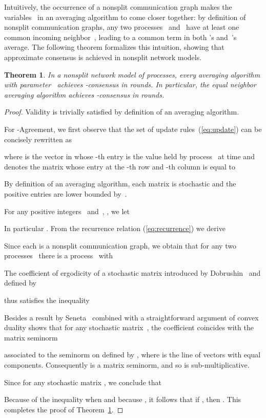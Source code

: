 \documentclass[a4paper]{article}
\theoremstyle{newthm}
\newtheorem{thm}{Theorem}
\begin{document}
Intuitively, the occurrence of a nonsplit communication graph makes
	 the variables~   in an averaging algorithm to come closer  
	 together: by definition of nonsplit communication graphs, any two 
	 processes~ and~ have at least one common incoming neighbor~, 
	 leading to a common term in both 's and~'s average.
The following theorem  formalizes this intuition, showing
     that approximate consensus is achieved in nonsplit network models.  

\begin{thm}\label{thm:nonsplit}
In a nonsplit network model of  processes, every averaging algorithm with parameter~
	achieves -consensus in 
	 rounds.
In particular, the equal neighbor averaging algorithm achieves -consensus in 
	 rounds. 
\end{thm}

\begin{proof}
Validity is trivially satisfied by definition of an averaging algorithm.

For -Agreement, we first observe that the set of update rules~(\ref{eq:update}) can be concisely rewritten as 
	
	where  is the vector in  whose -th entry is the value held by process~
	at time  and  denotes the  matrix whose entry at the -th row and -th
	column is equal to 
	
By definition of an averaging algorithm, each matrix  is stochastic and
	 the positive entries are lower bounded by~. 


	
For any positive integers~ and~, , we let 
	
In particular  . 
From the recurrence relation (\ref{eq:recurrence}) we derive 
	

Since each  is a nonsplit communication graph, we obtain that
     for any two processes~ there is a process~ with  



The coefficient of ergodicity of a stochastic matrix  introduced by Dobrushin~\cite{Dob56}
	and defined by 
	
	thus satisfies the inequality 
	
Besides a result by Seneta~\cite{Sen79} combined with a straightforward argument of convex duality shows 
	that for any stochastic matrix~, the coefficient  coincides with the matrix seminorm 
	 
	 associated to  the seminorm on  defined by
	, where  is the line
	of vectors with equal components.
Consequently  is a matrix seminorm, and so is sub-multiplicative.

Since   for any stochastic matrix , we conclude that
	
Because of the inequality   when 
	  and
	because , it follows that 
		if ,
		then .
This completes the proof of Theorem~\ref{thm:nonsplit}.
\end{proof}
\end{document}
